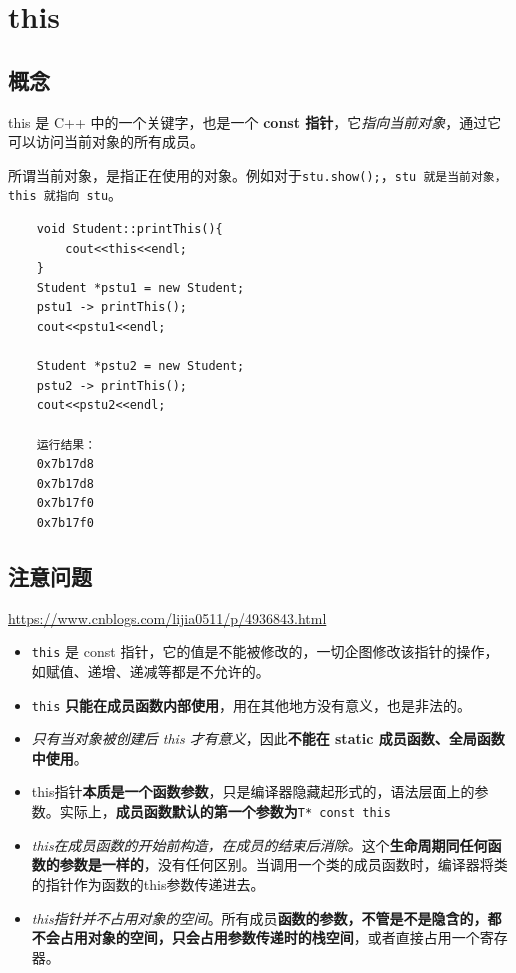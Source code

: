 \documentclass[UTF8,a4paper,12pt]{ctexbook} %
\begin{document}
\chapter{this}
	\section{概念}
		this 是 C++ 中的一个关键字，也是一个 \textbf{const 指针}，它\textit{指向当前对象}，通过它可以访问当前对象的所有成员。
		
		所谓当前对象，是指正在使用的对象。例如对于\verb|stu.show();|，\verb|stu 就是当前对象，this 就指向 stu|。
		
		\begin{lstlisting}
	void Student::printThis(){
		cout<<this<<endl;
	}
	Student *pstu1 = new Student;
	pstu1 -> printThis();
	cout<<pstu1<<endl;
	
	Student *pstu2 = new Student;
	pstu2 -> printThis();
	cout<<pstu2<<endl;
	
	运行结果：
	0x7b17d8
	0x7b17d8
	0x7b17f0
	0x7b17f0
		\end{lstlisting}
		
	
	\section{注意问题}
		\url{https://www.cnblogs.com/lijia0511/p/4936843.html}
		\begin{itemize}[itemindent = 1em]
			\item \verb|this| 是 const 指针，它的值是不能被修改的，一切企图修改该指针的操作，如赋值、递增、递减等都是不允许的。
			\item \verb|this| \textbf{只能在成员函数内部使用}，用在其他地方没有意义，也是非法的。
			\item \textit{只有当对象被创建后 this 才有意义}，因此\textbf{不能在 static 成员函数、全局函数中使用}。
			\item this指针\textbf{本质是一个函数参数}，只是编译器隐藏起形式的，语法层面上的参数。实际上，\textbf{成员函数默认的第一个参数为}\verb|T* const this|
			\item \textit{this在成员函数的开始前构造，在成员的结束后消除。}这个\textbf{生命周期同任何函数的参数是一样的}，没有任何区别。当调用一个类的成员函数时，编译器将类的指针作为函数的this参数传递进去。
			\item \textit{this指针并不占用对象的空间}。所有成员\textbf{函数的参数，不管是不是隐含的，都不会占用对象的空间，只会占用参数传递时的栈空间}，或者直接占用一个寄存器。
		\end{itemize}
		       
\end{document}
